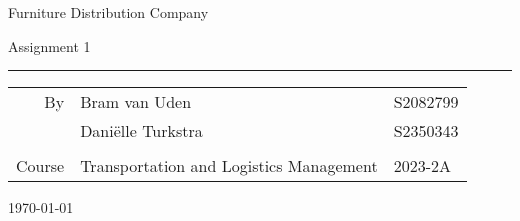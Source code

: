 \begin{titlepage}
\scshape
\vspace*{4cm}

\centering
\vspace{1.5cm}

\raisebox{-\baselineskip}{\rule{\textwidth}{2px}}
\vspace{0.3cm}

{\huge{{Furniture Distribution Company}}}\par \vspace{0.1cm}
{\large{{Assignment 1}}}\par  
\rule{\textwidth}{2px}

\vspace{4cm}

\begin{table}[H]
\centering
\begin{tabular}{p{5cm}p{5cm}p{5cm}}%
\multicolumn{1}{r}{By}                   & Bram van Uden       & S2082799          \\                  
                                         & Daniëlle Turkstra   & S2350343                                         \\
                                         &                                     \\        
 \multicolumn{1}{r}{Course}              & Transportation and Logistics Management       & 2023-2A          \\                                          
\end{tabular}
\end{table}

\vfill
\centering
\today %

\end{titlepage}




